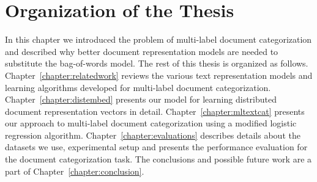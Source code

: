 \section{Organization of the Thesis}
In this chapter we introduced the problem of multi-label document categorization and described why better document representation models are needed to substitute the bag-of-words model. The rest of this thesis is organized as follows. Chapter~\ref{chapter:relatedwork} reviews the various text representation models and learning algorithms developed for multi-label document categorization. Chapter~\ref{chapter:distembed} presents our model for learning distributed document representation vectors in detail. Chapter~\ref{chapter:mltextcat} presents our approach to multi-label document categorization using a modified logistic regression algorithm. Chapter~\ref{chapter:evaluations} describes details about the datasets we use, experimental setup and presents the performance evaluation for the document categorization task. The conclusions and possible future work are a part of Chapter~\ref{chapter:conclusion}.






